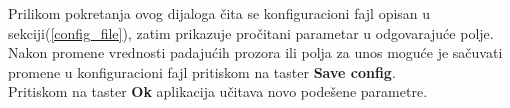 Prilikom pokretanja ovog dijaloga čita se konfiguracioni fajl opisan u
sekciji(\ref{config_file}), zatim prikazuje pročitani parametar u odgovarajuće
polje. \\

Nakon promene vrednosti padajućih prozora ili polja za unos moguće je sačuvati
promene u konfiguracioni fajl pritiskom na taster \textbf{Save config}. \\
Pritiskom na taster \textbf{Ok} aplikacija učitava novo podešene parametre. \\

\begin{figure}[H]
\end{figure}